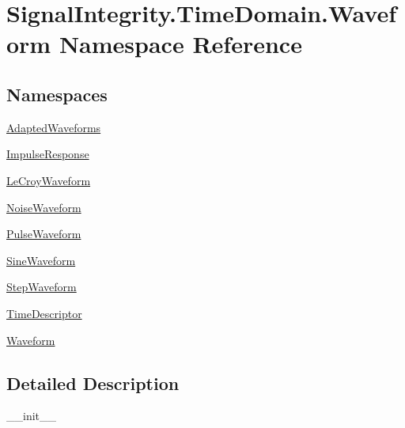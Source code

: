\hypertarget{namespaceSignalIntegrity_1_1TimeDomain_1_1Waveform}{}\section{Signal\+Integrity.\+Time\+Domain.\+Waveform Namespace Reference}
\label{namespaceSignalIntegrity_1_1TimeDomain_1_1Waveform}
\subsection*{Namespaces}
\begin{DoxyCompactItemize}
\item 
 \hyperlink{namespaceSignalIntegrity_1_1TimeDomain_1_1Waveform_1_1AdaptedWaveforms}{Adapted\+Waveforms}
\item 
 \hyperlink{namespaceSignalIntegrity_1_1TimeDomain_1_1Waveform_1_1ImpulseResponse}{Impulse\+Response}
\item 
 \hyperlink{namespaceSignalIntegrity_1_1TimeDomain_1_1Waveform_1_1LeCroyWaveform}{Le\+Croy\+Waveform}
\item 
 \hyperlink{namespaceSignalIntegrity_1_1TimeDomain_1_1Waveform_1_1NoiseWaveform}{Noise\+Waveform}
\item 
 \hyperlink{namespaceSignalIntegrity_1_1TimeDomain_1_1Waveform_1_1PulseWaveform}{Pulse\+Waveform}
\item 
 \hyperlink{namespaceSignalIntegrity_1_1TimeDomain_1_1Waveform_1_1SineWaveform}{Sine\+Waveform}
\item 
 \hyperlink{namespaceSignalIntegrity_1_1TimeDomain_1_1Waveform_1_1StepWaveform}{Step\+Waveform}
\item 
 \hyperlink{namespaceSignalIntegrity_1_1TimeDomain_1_1Waveform_1_1TimeDescriptor}{Time\+Descriptor}
\item 
 \hyperlink{namespaceSignalIntegrity_1_1TimeDomain_1_1Waveform_1_1Waveform}{Waveform}
\end{DoxyCompactItemize}


\subsection{Detailed Description}
\begin{DoxyVerb}__init__\end{DoxyVerb}
 